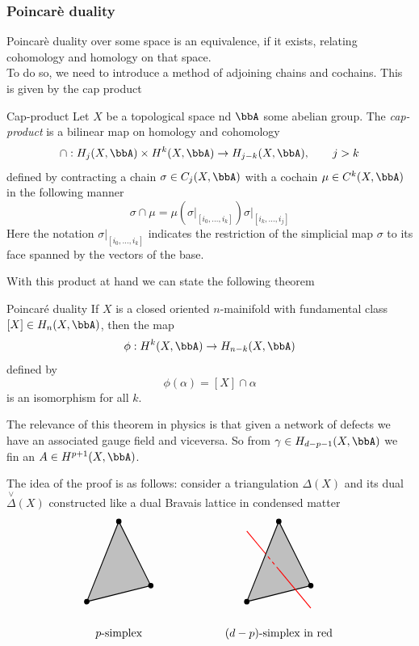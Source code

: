 \documentclass[11pt]{article}
\theoremstyle{definition}
\numberwithin{equation}{section}
\begin{document}
\subsubsection{Poincarè duality}
Poincarè duality over some space is an equivalence, if it exists, relating cohomology and homology on that space.\\
To do so, we need to introduce a method of adjoining chains and cochains. This is given by the cap product
\begin{defn}{Cap-product}{}
	Let $X$ be a topological space nd $\bbA$ some abelian group. The \textit{cap-product} is a bilinear map on homology and cohomology
	\begin{equation}
		\cap:H_j(X,\bbA)\times H^k(X,\bbA)\rightarrow H_{j-k}(X,\bbA),\qquad j>k
	\end{equation}
	defined by contracting a chain $\sigma\in C_j(X,\bbA)$ with a cochain $\mu\in C^k(X,\bbA)$ in the following manner
	\begin{equation}
		\sigma \cap \mu=\mu(\left.\sigma\right|_{[i_0,\ldots,i_k]})\left.\sigma\right|_{[i_k,\ldots,i_j]}
	\end{equation}
	Here the notation $\left.\sigma\right|_{[i_0,\ldots,i_k]}$ indicates the restriction of the simplicial map $\sigma$ to its face spanned by the vectors of the base.
\end{defn}
With this product at hand we can state the following theorem
\begin{thm}{Poincaré duality}{}
	If $X$ is a closed oriented $n$-mainifold with fundamental class $[X]\in H_n(X,\bbA)$, then the map 
	\begin{equation}
		\phi: H^k(X,\bbA)\rightarrow H_{n-k}(X,\bbA)
	\end{equation}
	defined by
	\begin{equation}
		\phi(\alpha)=[X]\cap \alpha
	\end{equation}
	is an isomorphism for all $k$.
\end{thm}
The relevance of this theorem in physics is that given a network of defects we have an associated gauge field and viceversa. So from $\gamma\in H_{d-p-1}(X,\bbA)$ we fin an $A\in H^{p+1}(X,\bbA)$. 

The idea of the proof is as follows: consider a triangulation $\Delta(X)$ and its dual $\overset{\vee}{\Delta}(X)$ constructed like a dual Bravais lattice in condensed matter
\begin{equation}
	\begin{tikzpicture}[thick]
		\path [fill=lightgray,draw] (0,-.5) to (2,0) to (1,2) to (0, -.5);
		\filldraw[black] (0,-.5) circle (2pt) node[]{};
		\filldraw[black] (2,0) circle (2pt) node[]{};
		\filldraw[black] (1,2) circle (2pt) node[]{};

		\path [fill=lightgray,draw] (5,-.5) to (7,0) to (6,2) to (5, -.5);
		\draw[-, red] (7,-.7)--(6,0.5);
		\draw[dashed, red] (6,0.5)--(5.59,0.99);
		\draw[-, red] (5.59,0.99)--(5,1.7);
	  	\filldraw[black] (5,-.5) circle (2pt) node[]{};
	  	\filldraw[black] (7,0) circle (2pt) node[]{};
	 	\filldraw[black] (6,2) circle (2pt) node[]{};
		

		\node at (1,-1.5) {$p$-simplex};
		\node at (6,-1.5) {$(d-p)$-simplex in red};
  \end{tikzpicture}
\end{equation}
\end{document}

